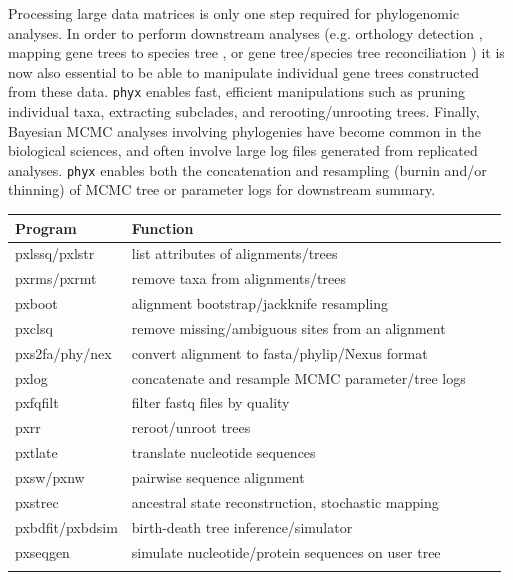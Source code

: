 \documentclass{bioinfo}
\begin{document}
\begin{methods}
Processing large data matrices is only one step required for phylogenomic analyses. In order to perform downstream analyses (e.g. orthology detection \citep{YangSmith2014}, mapping gene
trees to species tree \citep{Smith2015}, or gene tree/species tree reconciliation \citep{Mirarab2014}) it is now also essential to be able to manipulate individual gene trees constructed from these data.
\texttt{phyx} enables fast, efficient manipulations such as pruning
individual taxa, extracting subclades, and rerooting/unrooting trees.
Finally, Bayesian MCMC analyses involving phylogenies have become common in the biological sciences, and often involve
large log files generated from replicated analyses. \texttt{phyx} enables
both the concatenation and resampling (burnin and/or thinning) of MCMC
tree or parameter logs for downstream summary.
\begin{table}[!t]
 {\begin{tabular}{@{}llll@{}}\toprule Program &
Function\\\midrule
pxlssq/pxlstr & list attributes of alignments/trees\\
pxrms/pxrmt & remove taxa from alignments/trees\\
pxboot & alignment bootstrap/jackknife resampling\\
pxclsq & remove missing/ambiguous sites from an alignment\\
pxs2fa/phy/nex & convert alignment to fasta/phylip/Nexus format\\
pxlog & concatenate and resample MCMC parameter/tree logs\\
pxfqfilt & filter fastq files by quality\\
pxrr & reroot/unroot trees\\
pxtlate &  translate nucleotide sequences\\
pxsw/pxnw & pairwise sequence alignment\\
pxstrec & ancestral state reconstruction, stochastic mapping\\
pxbdfit/pxbdsim & birth-death tree inference/simulator\\
pxseqgen & simulate nucleotide/protein sequences on user tree\\\botrule
\end{tabular}}{}
\end{table}

\end{methods}
\end{document}

